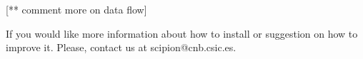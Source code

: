 [** comment more on data flow]


If you would like more information about how to install \scipion or suggestion on how to improve it. Please, contact us at scipion@cnb.csic.es.






 
